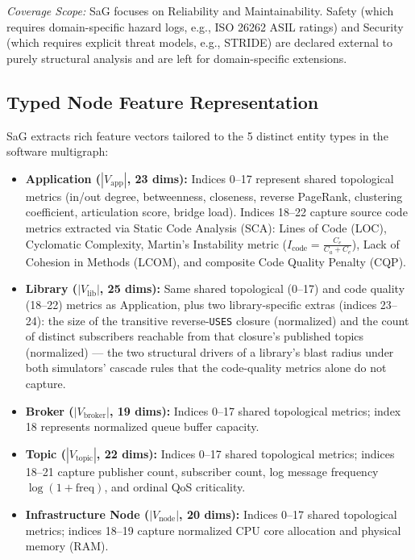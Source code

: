 \noindent\textit{Coverage Scope:} SaG focuses on Reliability and Maintainability. Safety (which requires domain-specific hazard logs, e.g., ISO 26262 ASIL ratings) and Security (which requires explicit threat models, e.g., STRIDE) are declared external to purely structural analysis and are left for domain-specific extensions.

\subsection{Typed Node Feature Representation}
\label{sec:4.2}

SaG extracts rich feature vectors tailored to the 5 distinct entity types in the software multigraph:
\begin{itemize}
    \item \textbf{Application ($|V_{\text{app}}|$, 23 dims):} Indices 0--17 represent shared topological metrics (in/out degree, betweenness, closeness, reverse PageRank, clustering coefficient, articulation score, bridge load). Indices 18--22 capture source code metrics extracted via Static Code Analysis (SCA): Lines of Code (LOC), Cyclomatic Complexity, Martin's Instability metric ($I_{\text{code}} = \frac{C_e}{C_a + C_e}$), Lack of Cohesion in Methods (LCOM), and composite Code Quality Penalty (CQP).
    \item \textbf{Library ($|V_{\text{lib}}|$, 25 dims):} Same shared topological (0--17) and code quality (18--22) metrics as Application, plus two library-specific extras (indices 23--24): the size of the transitive reverse-\texttt{USES} closure (normalized) and the count of distinct subscribers reachable from that closure's published topics (normalized) --- the two structural drivers of a library's blast radius under both simulators' cascade rules that the code-quality metrics alone do not capture.
    \item \textbf{Broker ($|V_{\text{broker}}|$, 19 dims):} Indices 0--17 shared topological metrics; index 18 represents normalized queue buffer capacity.
    \item \textbf{Topic ($|V_{\text{topic}}|$, 22 dims):} Indices 0--17 shared topological metrics; indices 18--21 capture publisher count, subscriber count, log message frequency $\log(1 + \text{freq})$, and ordinal QoS criticality.
    \item \textbf{Infrastructure Node ($|V_{\text{node}}|$, 20 dims):} Indices 0--17 shared topological metrics; indices 18--19 capture normalized CPU core allocation and physical memory (RAM).
\end{itemize}


